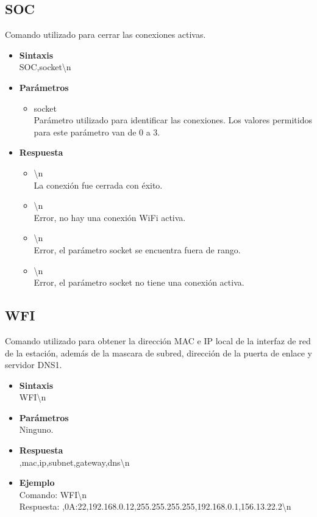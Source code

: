 \documentclass[a4paper,spanish]{article}
\begin{document}
\subsection{SOC}
Comando utilizado para cerrar las conexiones activas.  
\begin{itemize}
	\item \textbf{Sintaxis}\\
	{\ttfamily SOC,socket\textbackslash n}
	\item \textbf{Parámetros}
	\begin{itemize}
		\item{\ttfamily socket}\\
		Parámetro utilizado para identificar las conexiones. Los valores permitidos para este parámetro van de 0 a 3.
	\end{itemize}
	\item \textbf{Respuesta}
	\begin{itemize}
		\item{\textbackslash n} \\
		La conexión fue cerrada con éxito.
		\item{\textbackslash n} \\
		Error, no hay una conexión WiFi activa.
		\item{\textbackslash n} \\
		Error, el parámetro {\ttfamily socket} se encuentra fuera de rango.
		\item{\textbackslash n} \\
		Error, el parámetro {\ttfamily socket} no tiene una conexión activa.
	\end{itemize}
\end{itemize}

\subsection{WFI}
Comando utilizado para obtener la dirección MAC e IP local de la interfaz de red de la estación, además de la mascara de subred, dirección de la puerta de enlace y servidor DNS1.
\begin{itemize}
	\item \textbf{Sintaxis}\\
	{\ttfamily WFI\textbackslash n}
	\item \textbf{Parámetros}\\
	Ninguno.
	\item \textbf{Respuesta}\\
	{,mac,ip,subnet,gateway,dns\textbackslash n}
	\item\textbf{Ejemplo}\\
	Comando: {\ttfamily WFI\textbackslash n}\\
	Respuesta: {,0A:22,192.168.0.12,255.255.255.255,192.168.0.1,156.13.22.2\textbackslash n}
\end{itemize}
\end{document}
